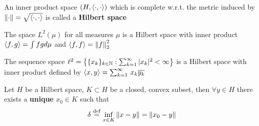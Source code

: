 \documentclass{article}
\begin{document}
\begin{definition}
	An inner product space $(H, \left<{\cdot},{\cdot}\right>)$ which is complete w.r.t. the metric induced by $\left\|{\cdot}\right\|=\sqrt{\left<{\cdot},{\cdot}\right>}$ is called a \textbf{Hilbert space}
\end{definition}

\begin{example}[$L^2-$spaces]
	The space $L^2(\mu)$ for all measures $\mu$ is a Hilbert space with inner product $\left<{f},{g}\right>=\int fg d\mu$ and $\left<{f},{f}\right>=\left\|{f}\right\|_2^2$
\end{example}

\begin{example}[$l^2-$spaces]
	The sequence space
	$\ell^2=
		\left\{\{x_k\}_{k\in \mathbb{N}}:\sum_{k=1}^\infty |x_k|^2<\infty \right\}$
	is a Hilbert space with inner product defined by
	$
		\left<{x},{y}\right>=\sum_{k=1}^\infty \,{x_k \overline{y_k}}
	$
\end{example}

\begin{theorem}
	\nextline
	\label{nearest point}
	Let $H$ be a Hilbert space, $K\subset H$ be a closed, convex subset, then $\forall y \in H$ there exists a {\bf{unique}} $x_0\in K$ such that
	$$
		\delta \overset{\rm{def}}{=} \inf_{x\in K} \left\|{x-y}\right\| = \left\|{x_0-y}\right\|
	$$
\end{theorem}
\end{document}

